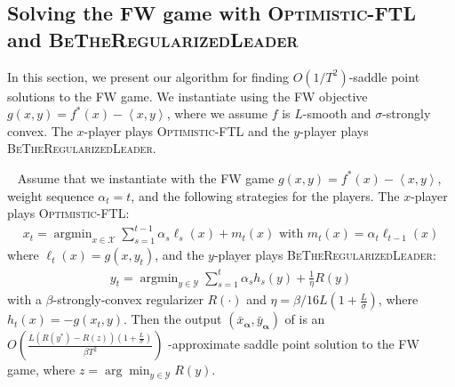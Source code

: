 \documentclass[final,12pt]{colt2018} %
\def\argmin{\mathop{\arg\min}}
\def\balpha{\boldsymbol{\alpha}}
\def\BTRL{\textsc{BeTheRegularizedLeader}\xspace}
\def\OFTL{\textsc{Optimistic-FTL}\xspace}
\newcommand{\lr}[2]{\left\langle#1,#2\right\rangle}
\newcommand{\XX}{\mathcal{X}}
\newcommand{\YY}{\mathcal{Y}}
\newcommand{\pr}[1]{\left(#1\right)}
\begin{document}
\subsection{Solving the FW game with \OFTL and \BTRL}
In this section, we present our algorithm for finding $O(1/T^2)$-saddle point solutions to the FW game. We instantiate  using the FW objective $g(x,y) = f^*(x) - \lr{x}{y}$, where we assume $f$ is $L$-smooth and $\sigma$-strongly convex. The $x$-player plays \OFTL and the $y$-player plays \BTRL.
\begin{theorem}~\label{thm:FWgame}
Assume that we instantiate  with the FW game $g(x,y) = f^*(x) - \lr{x}{y}$, weight sequence $\alpha_t=t$, and the following strategies for the players. The $x$-player plays \OFTL: 
\begin{align}\label{eq:XplayerFWgame}
  \textstyle x_t = \argmin_{x \in \XX} \sum_{s=1}^{t-1} \alpha_s \ell_s(x) + m_{t}(x) \text{ with } m_{t}(x) = \alpha_{t} \ell_{{t-1}}(x)
\end{align}
where $\ell_t(x) = g(x,y_t)$, and the $y$-player plays \BTRL: 
\begin{align}\label{eq:YplayerFWgame}
\textstyle y_t = \argmin_{y \in \YY} \sum_{s=1}^{t} \alpha_s h_s(y) + \frac{1}{\eta} R(y)
\end{align}
with a $\beta$-strongly-convex regularizer $R(\cdot)$ and $\eta = {\beta }/{ 16L ( 1 + \frac{L}{\sigma})}$, where $h_t(x) = -g(x_t,y)$. Then the output $(\bar{x}_{\balpha},\bar{y}_{\balpha})$ of    is 
an $O\pr{ \frac{ L ( R(y^*) - R(z) )(1+\frac{L}{\sigma}) }{ \beta T^2}}$
-approximate saddle point solution to the FW game,
where $z = \arg\min_{{y\in \YY}} R(y) $.
\end{theorem}
\end{document}
